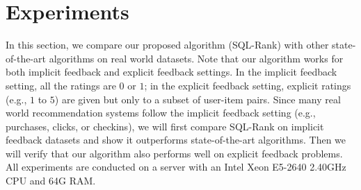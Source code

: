 \documentclass{article}
\begin{document}
\section{Experiments}
\label{exp}
In this section, we compare our proposed algorithm (SQL-Rank) with other state-of-the-art algorithms on real world datasets. 
Note that our algorithm works for both implicit feedback and explicit feedback settings. In the implicit feedback setting, all the ratings are $0$ or $1$; 
in the explicit feedback setting, explicit ratings (e.g., $1$ to $5$) are given but only to a subset of user-item pairs. 
Since many real world recommendation systems follow the implicit feedback setting (e.g., purchases, clicks, or checkins), we will first compare SQL-Rank on implicit feedback datasets and show it outperforms state-of-the-art algorithms. Then we will verify that our algorithm also performs well on explicit feedback problems. 
All experiments are conducted on a server with an Intel Xeon E5-2640 2.40GHz CPU and 64G RAM.
\end{document}
